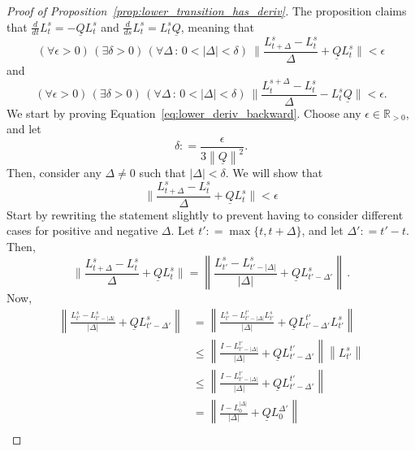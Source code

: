 \documentclass[10pt]{paper}
\theoremstyle{definition}
\newcommand{\reals}{\mathbb{R}}
\newcommand{\realspos}{\reals_{>0}}
\newcommand{\lbound}{L}
\newcommand{\lrate}{\underline{Q}}
\newcommand{\norm}[1]{\left\lVert #1 \right\rVert}
\newcommand{\coloneqq}{:\!=}
\begin{document}
\begin{proof}[Proof of Proposition~\ref{prop:lower_transition_has_deriv}]
The proposition claims that $\frac{d}{dt}L_t^s=-\lrate L_t^s$ and $\frac{d}{ds}L_t^s=L_t^s\lrate$, meaning that
\begin{equation}\label{eq:lower_deriv_backward}
(\forall\epsilon>0)\,
(\exists\delta>0)\,
(\forall\Delta\,:\,0<\lvert\Delta\rvert <\delta)~
\Big\lVert\frac{L_{t+\Delta}^s-L_t^s}{\Delta}+\lrate L_t^s\Big\rVert<\epsilon
\end{equation}
and
\begin{equation}\label{eq:lower_deriv_forward}
(\forall\epsilon>0)\,
(\exists\delta>0)\,
(\forall\Delta\,:\,0<\lvert\Delta\rvert<\delta)~
\Big\lVert\frac{L_{t}^{s+\Delta}-L_t^s}{\Delta}-\lbound_t^s\lrate \Big\rVert<\epsilon.
\end{equation}
We start by proving Equation~\eqref{eq:lower_deriv_backward}. Choose any $\epsilon\in\realspos$, and let
\begin{equation}\label{eq:derivative_max_delta}
\delta \coloneqq \frac{\epsilon}{3\norm{\lrate}^2}.
\end{equation}
Then, consider any $\Delta\neq 0$ such that $\lvert\Delta\rvert<\delta$. We will show that
\begin{equation*}
\Big\lVert\frac{L_{t+\Delta}^s-L_t^s}{\Delta}+\lrate L_t^s\Big\rVert<\epsilon
\end{equation*}
Start by rewriting the statement slightly to prevent having to consider different cases for positive and negative $\Delta$. Let $t'\coloneqq\max\{t,t+\Delta\}$, and let $\Delta'\coloneqq t'-t$. Then,
\begin{equation*}
\Big\lVert\frac{L_{t+\Delta}^s-L_t^s}{\Delta}+\lrate L_t^s\Big\rVert = \norm{\frac{L_{t'}^s - L_{t'-\lvert\Delta\rvert}^s}{\lvert\Delta\rvert}+\lrate L_{t'-\Delta'}^s}\,.
\end{equation*}
Now,
\begin{align*}
\norm{\frac{L_{t'}^s - L_{t'-\lvert\Delta\rvert}^s}{\lvert\Delta\rvert}+\lrate L_{t'-\Delta'}^s} &= \norm{\frac{L_{t'}^s - L_{t'-\lvert\Delta\rvert}^{t'}L_{t'}^s}{\lvert\Delta\rvert}+\lrate L_{t'-\Delta'}^{t'}L_{t'}^s} \\
 &\leq \norm{\frac{I - L_{t'-\lvert\Delta\rvert}^{t'}}{\lvert\Delta\rvert}+\lrate L_{t'-\Delta'}^{t'}}\norm{L_{t'}^s} \\
 &\leq \norm{\frac{I - L_{t'-\lvert\Delta\rvert}^{t'}}{\lvert\Delta\rvert}+\lrate L_{t'-\Delta'}^{t'}} \\
 &= \norm{\frac{I - L_{0}^{\lvert\Delta\rvert}}{\lvert\Delta\rvert}+\lrate L_{0}^{\Delta'}} \\

\end{align*}
\end{proof}
\end{document}
